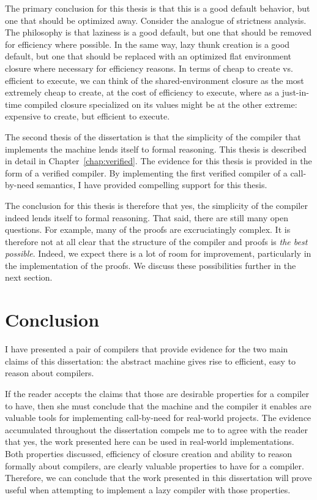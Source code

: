 The primary conclusion for this thesis is that this is a good default behavior,
but one that should be optimized away. Consider the analogue of strictness
analysis. The philosophy is that laziness is a good default, but one that should
be removed for efficiency where possible. In the same way, lazy thunk creation
is a good default, but one that should be replaced with an optimized flat
environment closure where necessary for efficiency reasons. In terms of cheap to
create vs. efficient to execute, we can think of the shared-environment closure
as the most extremely cheap to create, at the cost of efficiency to execute,
where as a just-in-time compiled closure specialized on its values might be at
the other extreme: expensive to create, but efficient to execute. 

The second thesis of the dissertation is that the simplicity of the compiler
that implements the \ce machine lends itself to formal reasoning. This thesis is
described in detail in Chapter~\ref{chap:verified}. The evidence for this thesis
is provided in the form of a verified compiler. By implementing the first
verified compiler of a call-by-need semantics, I have provided compelling
support for this thesis. 

The conclusion for this thesis is therefore that yes, the simplicity of the
compiler indeed lends itself to formal reasoning. That said, there are still
many open questions. For example, many of the proofs are excruciatingly complex.
It is therefore not at all clear that the structure of the compiler and proofs
is \emph{the best possible}. Indeed, we expect there is a lot of room for
improvement, particularly in the implementation of the proofs. We discuss these
possibilities further in the next section. 

\section{Conclusion}

I have presented a pair of compilers that provide evidence for the two main
claims of this dissertation: the \ce abstract machine gives rise to efficient,
easy to reason about compilers. 

If the reader accepts the claims that those are desirable properties for a
compiler to have, then she must conclude that the \ce machine and the compiler
it enables are valuable tools for implementing call-by-need for real-world
projects. The evidence accumulated throughout the dissertation compels me to
to agree with the reader that yes, the work presented here can be used in
real-world implementations. Both properties discussed, efficiency of closure
creation and ability to reason formally about compilers, are clearly valuable
properties to have for a compiler. Therefore, we can conclude that the work
presented in this dissertation will prove useful when attempting to implement a
lazy compiler with those properties. 



